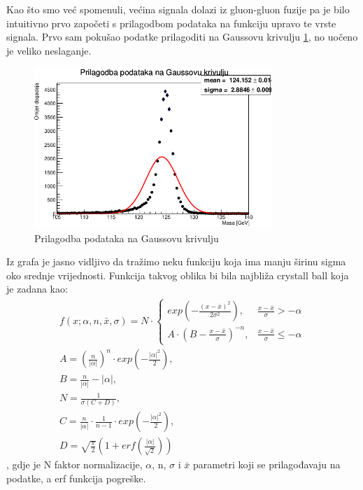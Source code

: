 \documentclass[12pt,a4paper,oneside]{article}
\begin{document}
\begin{linenumbers}
		Kao što smo već spomenuli, većina signala dolazi iz gluon-gluon fuzije pa je bilo intuitivno prvo započeti s prilagodbom podataka na funkciju upravo te vrste signala.
		Prvo sam pokušao podatke prilagoditi na Gaussovu krivulju \ref{sl:gauss-fit}, no uočeno je veliko neslaganje.
		\begin{figure}[h!]
			\centering
			\includegraphics[width=0.8\textwidth]{gauss-fit1.png}
			\caption[Saturn viđen u ultraljubičastom svjetlu.]{\label{sl:gauss-fit} Prilagodba podataka na Gaussovu krivulju}
		\end{figure}
		Iz grafa je jasno vidljivo da tražimo neku funkciju koja ima manju širinu sigma oko srednje vrijednosti. Funkcija takvog oblika bi bila najbliža crystall ball koja je zadana kao:
		\begin{equation}
		\begin{split}
		f(x; \alpha, n, \bar{x}, \sigma)= N \cdot \begin{cases}
		exp(- \frac{(x-\bar{x})^2}{2\sigma^2}),& \frac{x-\bar{x}}{\sigma}> -\alpha\\
		A \cdot (B- \frac{x-\bar{x}}{\sigma})^{-n},& \frac{x-\bar{x}}{\sigma} \leqslant - \alpha
		\end{cases}\\
		A = (\frac{n}{|\alpha|})^n \cdot exp(- \frac{|\alpha|^2}{2}), \\
		B = \frac{n}{|\alpha|} - |\alpha|, \\
		N = \frac{1}{\sigma (C+D)}, \\
		C = \frac{n}{|\alpha|} \cdot \frac{1}{n-1} \cdot exp(- \frac{|\alpha|^2}{2}), \\
		D = \sqrt{\frac{\pi}{2}} (1+erf(\frac{|\alpha|}{\sqrt{2}}))
		\end{split}
		\end{equation}
		, gdje je N faktor normalizacije, $\alpha$, n, $\sigma$ i $\bar{x}$ parametri koji se prilagođavaju na podatke, a erf funkcija pogreške.

\end{linenumbers}
\end{document}
